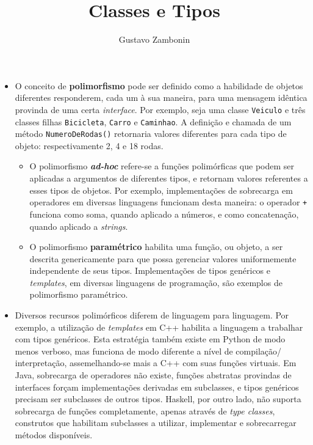\documentclass{../sftex/sftex}
\title{Classes e Tipos}
\author{Gustavo Zambonin}
\begin{document}
\maketitle

\begin{itemize}
    \item O conceito de \textbf{polimorfismo} pode ser definido como a
    habilidade de objetos diferentes responderem, cada um à sua maneira, para
    uma mensagem idêntica provinda de uma certa \emph{interface}. Por exemplo,
    seja uma classe \verb!Veiculo! e três classes filhas \verb!Bicicleta!,
    \verb!Carro! e \verb!Caminhao!. A definição e chamada de um método
    \verb!NumeroDeRodas()! retornaria valores diferentes para cada tipo de
    objeto: respectivamente 2, 4 e 18 rodas.
    \begin{itemize}

        \item O polimorfismo \textbf{\emph{ad-hoc}} refere-se a funções
        polimórficas que podem ser aplicadas a argumentos de diferentes tipos,
        e retornam valores referentes a esses tipos de objetos. Por exemplo,
        implementações de sobrecarga em operadores em diversas linguagens
        funcionam desta maneira: o operador \verb!+! funciona como soma,
        quando aplicado a números, e como concatenação, quando aplicado a
        \emph{strings}.

        \item O polimorfismo \textbf{paramétrico} habilita uma função, ou
        objeto, a ser descrita genericamente para que possa gerenciar valores
        uniformemente independente de seus tipos. Implementações de tipos
        genéricos e \emph{templates}, em diversas linguagens de programação,
        são exemplos de polimorfismo paramétrico.
    \end{itemize}

    \item Diversos recursos polimórficos diferem de linguagem para linguagem.
    Por exemplo, a utilização de \emph{templates} em C++ habilita a linguagem
    a trabalhar com tipos genéricos. Esta estratégia também existe em Python de
    modo menos verboso, mas funciona de modo diferente a nível de compilação/
    interpretação, assemelhando-se mais a C++ com suas funções virtuais. Em
    Java, sobrecarga de operadores não existe, funções abstratas provindas de
    interfaces forçam implementações derivadas em subclasses, e tipos genéricos
    precisam ser subclasses de outros tipos. Haskell, por outro lado, não
    suporta sobrecarga de funções completamente, apenas através de
    \emph{type classes}, construtos que habilitam subclasses a utilizar,
    implementar e sobrecarregar métodos disponíveis.


\end{itemize}
\end{document}
